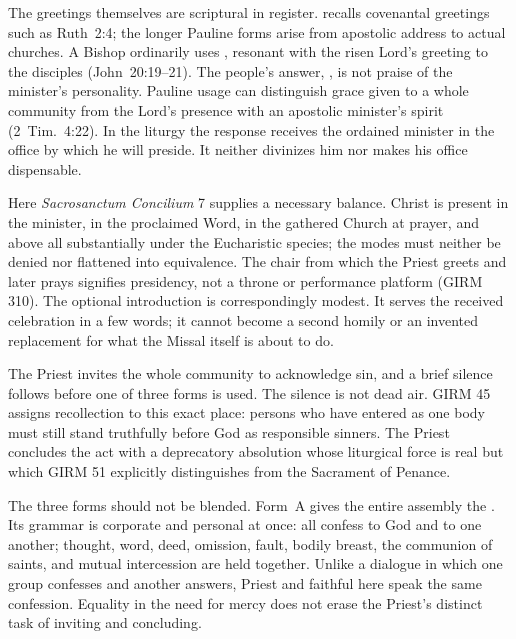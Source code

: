 The greetings themselves are scriptural in register.  recalls covenantal greetings such as Ruth~2:4; the longer Pauline forms arise from apostolic address to actual churches. A Bishop ordinarily uses , resonant with the risen Lord's greeting to the disciples (John~20:19--21). The people's answer, , is not praise of the minister's personality. Pauline usage can distinguish grace given to a whole community from the Lord's presence with an apostolic minister's spirit (2~Tim.~4:22). In the liturgy the response receives the ordained minister in the office by which he will preside. It neither divinizes him nor makes his office dispensable.

Here \emph{Sacrosanctum Concilium} 7 supplies a necessary balance. Christ is present in the minister, in the proclaimed Word, in the gathered Church at prayer, and above all substantially under the Eucharistic species; the modes must neither be denied nor flattened into equivalence. The chair from which the Priest greets and later prays signifies presidency, not a throne or performance platform (GIRM 310). The optional introduction is correspondingly modest. It serves the received celebration in a few words; it cannot become a second homily or an invented replacement for what the Missal itself is about to do.


The Priest invites the whole community to acknowledge sin, and a brief silence follows before one of three forms is used. The silence is not dead air. GIRM 45 assigns recollection to this exact place: persons who have entered as one body must still stand truthfully before God as responsible sinners. The Priest concludes the act with a deprecatory absolution whose liturgical force is real but which GIRM 51 explicitly distinguishes from the Sacrament of Penance.

The three forms should not be blended. Form~A gives the entire assembly the . Its grammar is corporate and personal at once: all confess to God and to one another; thought, word, deed, omission, fault, bodily breast, the communion of saints, and mutual intercession are held together. Unlike a dialogue in which one group confesses and another answers, Priest and faithful here speak the same confession. Equality in the need for mercy does not erase the Priest's distinct task of inviting and concluding.

